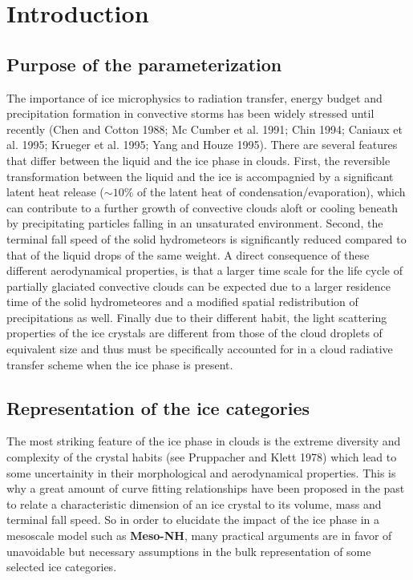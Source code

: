 \section{Introduction}
%
\subsection{Purpose of the parameterization}
%

The importance of ice microphysics to radiation transfer, energy budget and
precipitation formation in convective storms has been widely stressed until
recently (Chen and Cotton 1988; Mc Cumber et al. 1991;  Chin 1994; Caniaux
et al. 1995; Krueger et al. 1995; Yang and Houze 1995). There are several
features that differ between the liquid and the ice phase in clouds. First, the
reversible transformation between the liquid and the ice is accompagnied by a
significant latent heat release ($\sim 10\%$ of the latent heat of
condensation/evaporation), which can contribute to a further growth of convective
clouds aloft or cooling beneath by precipitating particles falling in an
unsaturated environment. Second, the terminal fall speed of the solid
hydrometeors is significantly reduced compared to that of the liquid drops of
the same weight. A direct consequence of these different aerodynamical
properties, is that a larger time scale for the life cycle of partially
glaciated convective clouds can be expected due to a larger residence time
of the solid hydrometeores and a modified spatial redistribution of
precipitations as well. Finally due to their different habit,
the light scattering properties of the ice crystals are different from those of
the cloud droplets of equivalent size and thus must be specifically accounted
for in a cloud radiative transfer scheme when the ice phase is present.

%
\subsection{Representation of the ice categories}
%

The most striking feature of the ice phase in clouds is the extreme diversity
and complexity of the crystal habits (see Pruppacher and Klett 1978) which
lead to some uncertainity in their morphological and aerodynamical properties.
This is why a great amount of curve fitting relationships have been proposed
in the past to relate a characteristic dimension of an ice crystal to its
volume, mass and terminal fall speed. So in order to elucidate the impact of
the ice phase in a mesoscale model such as {\bf Meso-NH}, many practical
arguments are in favor of unavoidable but necessary assumptions in the bulk
representation of some selected ice categories.

